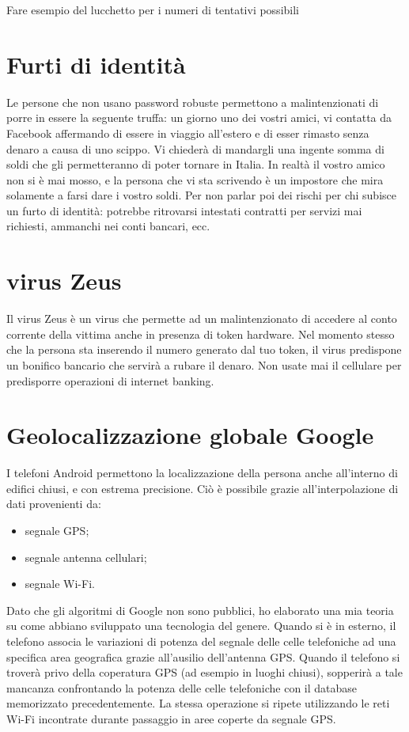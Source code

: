 \documentclass[italian,a4paper,12pt,oneside]{report}
\begin{document}
Fare esempio del lucchetto per i numeri di tentativi possibili

\section{Furti di identità}
Le persone che non usano password robuste permettono a malintenzionati di
porre in essere la seguente truffa: un giorno uno dei vostri amici, vi contatta
da Facebook affermando di essere in viaggio all'estero e di esser rimasto senza
denaro a causa di uno scippo. Vi chiederà di mandargli una ingente somma di
soldi che gli permetteranno di poter tornare in Italia. In realtà il vostro
amico non si è mai mosso, e la persona che vi sta scrivendo è un impostore
che mira solamente a farsi dare i vostro soldi.
Per non parlar poi dei rischi per chi subisce un furto di identità: potrebbe
ritrovarsi intestati contratti per servizi mai richiesti, ammanchi nei conti
bancari, ecc.

\section{virus Zeus}
Il virus Zeus è un virus che permette ad un malintenzionato di accedere al
conto corrente della vittima anche in presenza di token hardware. Nel momento
stesso che la persona sta inserendo il numero generato dal tuo token, il virus
predispone un bonifico bancario che servirà a rubare il denaro.
Non usate mai il cellulare per predisporre operazioni di internet banking.

\section{Geolocalizzazione globale Google}
I telefoni Android permettono la localizzazione della persona anche all'interno
di edifici chiusi, e con estrema precisione. Ciò è possibile grazie
all'interpolazione di dati provenienti da:
\begin{itemize}
 \item segnale GPS;
 \item segnale antenna cellulari;
 \item segnale Wi-Fi.
\end{itemize}
Dato che gli algoritmi di Google non sono pubblici, ho elaborato una mia teoria
su come abbiano sviluppato una tecnologia del genere.
Quando si è in esterno, il telefono associa le variazioni di potenza del
segnale delle celle telefoniche ad una specifica area geografica grazie
all'ausilio dell'antenna GPS. Quando il telefono si troverà privo della
coperatura GPS (ad esempio in luoghi chiusi), sopperirà a tale mancanza
confrontando la potenza delle celle telefoniche con il database memorizzato
precedentemente. La stessa operazione si ripete utilizzando le reti Wi-Fi
incontrate durante passaggio in aree coperte da segnale GPS.
\end{document}
